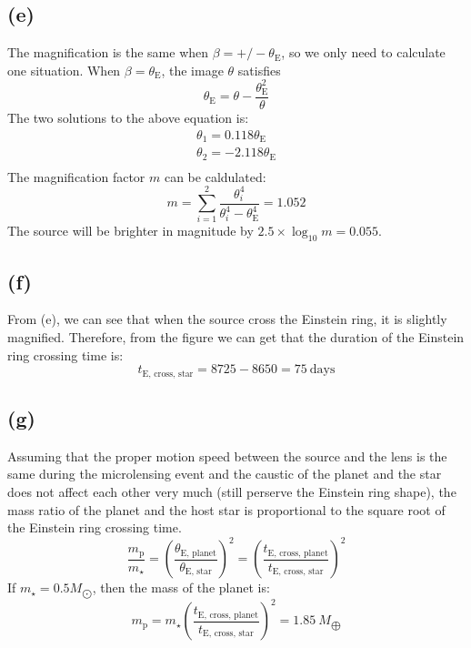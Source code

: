 \documentclass[a4paper,12pt]{article}
\begin{document}
\subsection*{(e)}
The magnification is the same when $\beta = +/-\theta_{\text{E}}$, so we only need to 
calculate one situation. When $\beta = \theta_{\text{E}}$, the image $\theta$ satisfies
\begin{equation}
    \theta_\text{E} = \theta - \frac{\theta_{\text{E}}^2}{\theta}
\end{equation}
The two solutions to the above equation is:
\begin{align*}
    \theta_1 = 0.118 \theta_{\text{E}} \\
    \theta_2 = -2.118 \theta_{\text{E}} \\
\end{align*}
The magnification factor $m$ can be caldulated:
\begin{equation}
    m = \sum_{i = 1}^{2} \frac{\theta_i^4}{\theta_i^4 - \theta_{\text{E}}^4} = 1.052
\end{equation}
The source will be brighter in magnitude by $2.5\times \log_{10} m = 0.055$.

\subsection*{(f)}
From (e), we can see that when the source cross the 
Einstein ring, it is slightly magnified. Therefore, 
from the figure we can get that the duration of the Einstein 
ring crossing time is:
\begin{equation}
    t_{\text{E, cross, star}} = 8725 - 8650 = 75 \ \text{days}
\end{equation}

\subsection*{(g)}
Assuming that the proper motion speed between the source 
and the lens is the same during the microlensing event
and the caustic of the planet and the star does not affect each other
 very much (still perserve the Einstein ring shape), 
the mass ratio of the planet and the host star 
is proportional to the square root of the Einstein ring 
crossing time.
\begin{equation}
    \frac{m_{\text{p}}}{m_{\star}} = (\frac{\theta_{\text{E, planet}}}{\theta_{\text{E, star}}})^2 = (\frac{t_{\text{E, cross, planet}}}{t_{\text{E, cross, star}}})^2
\end{equation}
If $m_{\star} = 0.5 M_{\bigodot}$, then the mass of the planet is:
\begin{equation}
    m_{\text{p}} = m_\star (\frac{t_{\text{E, cross, planet}}}{t_{\text{E, cross, star}}})^2 = 1.85 \ M_{\bigoplus}
\end{equation}
\end{document}
